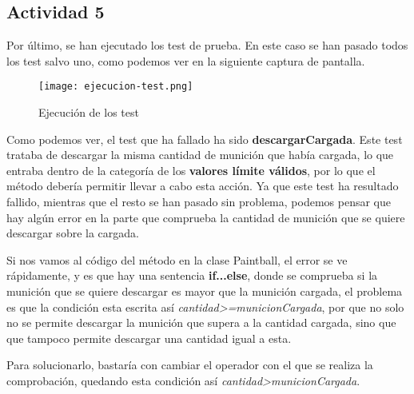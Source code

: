 \subsection{Actividad 5}
Por último, se han ejecutado los test de prueba. En este caso se han pasado todos los test salvo uno, como podemos ver en la siguiente captura de pantalla.

\begin{figure}[ht]
    \centering
    \texttt{[image: ejecucion-test.png]}
    \caption{Ejecución de los test}
\end{figure}

Como podemos ver, el test que ha fallado ha sido \textbf{descargarCargada}. Este test trataba de descargar la misma cantidad de munición que había cargada, lo que entraba dentro de la categoría de los \textbf{valores límite válidos}, por lo que el método debería permitir llevar a cabo esta acción. Ya que este test ha resultado fallido, mientras que el resto se han pasado sin problema, podemos pensar que hay algún error en la parte que comprueba la cantidad de munición que se quiere descargar sobre la cargada.

Si nos vamos al código del método en la clase Paintball, el error se ve rápidamente, y es que hay una sentencia \textbf{if...else}, donde se comprueba si la munición que se quiere descargar es mayor que la munición cargada, el problema es que la condición esta escrita así \textit{cantidad>=municionCargada}, por que no solo no se permite descargar la munición que supera a la cantidad cargada, sino que que tampoco permite descargar una cantidad igual a esta.

Para solucionarlo, bastaría con cambiar el operador con el que se realiza la comprobación, quedando esta condición así \textit{cantidad>municionCargada}.

\newpage



